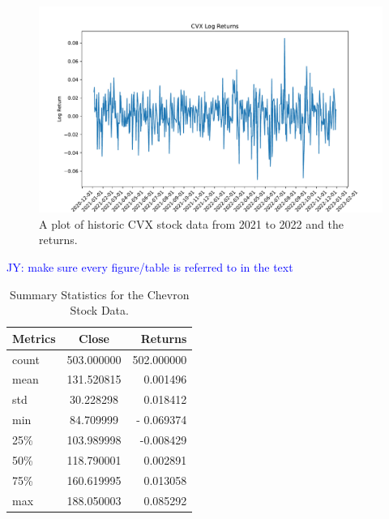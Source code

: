 \documentclass[12pt, letterpaper, titlepage]{article}
\newcommand{\jy}[1]{\textcolor{blue}{JY: #1}}
\begin{document}
\begin{figure}[tbp]
  \begin{center}
  \includegraphics[width=\textwidth]{../figures/fig2.pdf}
  \caption{A plot of historic CVX stock data from 2021 to 2022 and the returns.}\label{fig:returns}
  \end{center}
\end{figure}

\jy{make sure every figure/table is referred to in the text}



\begin{table}[tbp]
  \begin{center}
    \caption{Summary Statistics for the Chevron Stock Data.}
    \label{tab:sumstat}
    \begin{tabular}{lcr} %
      \toprule
      {Metrics} & {Close} & {Returns}\\
      \midrule
      count & 503.000000 & 502.000000\\
      mean & 131.520815 & 0.001496\\
      std & 30.228298 & 0.018412\\
      min & 84.709999	 & - 0.069374\\
      25\% & 103.989998 & -0.008429\\
      50\% & 118.790001 & 0.002891\\
      75\% & 160.619995 & 0.013058\\
      max & 188.050003 & 0.085292\\
      \bottomrule
    \end{tabular}
  \end{center}
\end{table}
\end{document}
